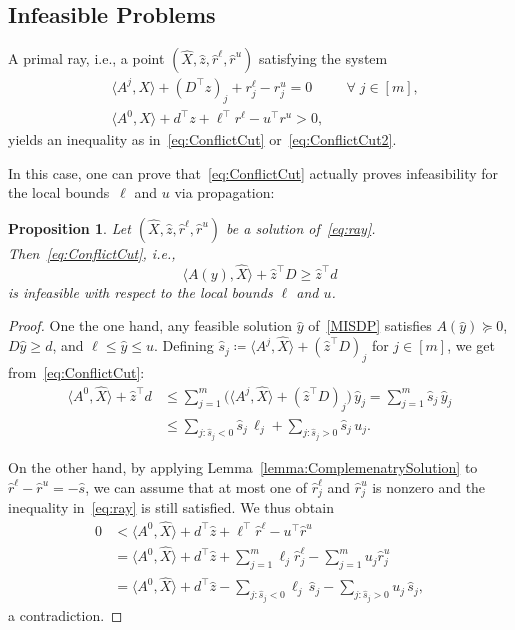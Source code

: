 \documentclass[10pt, a4paper]{article}
\newcommand{\define}{\coloneqq}
\newcommand{\skal}[2]{\langle{#1},{#2}\rangle}
\newcommand{\T}{^{\top}}
\newtheorem{proposition}[theorem]{Proposition}
\begin{document}
\subsection{Infeasible Problems}

A primal ray, i.e., a point $(\hat{X}, \hat{z}, \hat{r}^\ell, \hat{r}^u)$
satisfying the system
\begin{equation}\label{eq:ray}
\begin{aligned}
  & \skal{A^j}{X} + (D\T z)_j + r^\ell_j - r^u_j = 0 && \forall\; j \in [m],\\
  & \skal{A^0}{X} + d\T z + \ell\T r^\ell - u\T r^u > 0,
\end{aligned}
\end{equation}
yields an inequality as in~\eqref{eq:ConflictCut}
or~\eqref{eq:ConflictCut2}.

In this case, one can prove that~\eqref{eq:ConflictCut} actually proves
infeasibility for the local bounds~$\ell$ and $u$ via propagation:

\begin{proposition}
  Let $(\hat{X}, \hat{z}, \hat{r}^\ell, \hat{r}^u)$ be a solution
  of~\eqref{eq:ray}. Then~\eqref{eq:ConflictCut}, i.e.,
  \[
    \skal{A(y)}{\hat{X}} + \hat{z}\T D \geq \hat{z}\T d
  \]
  is infeasible with respect to the local bounds $\ell$ and $u$.
\end{proposition}

\begin{proof}
  One the one hand, any feasible solution $\hat{y}$ of~\eqref{MISDP} satisfies
  $A(\hat{y}) \succeq 0$, $D \hat{y} \geq d$, and
  $\ell \leq \hat{y} \leq u$. Defining
  $\hat{s}_j \define \skal{A^j}{\hat{X}} + (\hat{z}\T D)_j$ for
  $j \in [m]$, we get from~\eqref{eq:ConflictCut}:
  \begin{align*}
    \skal{A^0}{\hat{X}} + \hat{z}\T d & \leq \sum_{j=1}^m \big(\skal{A^j}{\hat{X}} + (\hat{z}\T D)_j\big)\, \hat{y}_j
    = \sum_{j=1}^m \hat{s}_j\, \hat{y}_j\\
    & \leq \sum_{j: \hat{s}_j < 0} \hat{s}_j\, \ell_j +
        \sum_{j: \hat{s}_j > 0} \hat{s}_j\, u_j.
  \end{align*}

  On the other hand, by applying Lemma~\ref{lemma:ComplemenatrySolution} to
  $\hat{r}^\ell - \hat{r}^u = -\hat{s}$, we can assume that at most one of
  $\hat{r}^\ell_j$ and $\hat{r}^u_j$ is nonzero and the inequality
  in~\eqref{eq:ray} is still satisfied. We thus obtain
  \begin{align*}
    0 & < \skal{A^0}{\hat{X}} + d\T \hat{z} + \ell\T \hat{r}^\ell - u\T \hat{r}^u\\
      & = \skal{A^0}{\hat{X}} + d\T \hat{z} + \sum_{j=1}^m \ell_j \hat{r}^\ell_j -
        \sum_{j=1}^m u_j \hat{r}^u_j\\
      & = \skal{A^0}{\hat{X}}  + d\T \hat{z} - \sum_{j: \hat{s}_j < 0} \ell_j\, \hat{s}_j -
        \sum_{j: \hat{s}_j > 0} u_j\, \hat{s}_j,
  \end{align*}
  a contradiction.
\end{proof}
\end{document}
